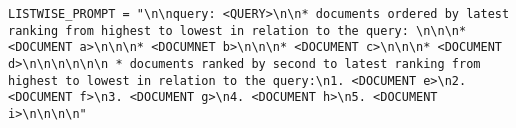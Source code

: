
\begin{lstlisting}[style=promptstyle]
LISTWISE_PROMPT = "\n\nquery: <QUERY>\n\n* documents ordered by latest ranking from highest to lowest in relation to the query: \n\n\n* <DOCUMENT a>\n\n\n* <DOCUMNET b>\n\n\n* <DOCUMENT c>\n\n\n* <DOCUMENT d>\n\n\n\n\n\n * documents ranked by second to latest ranking from highest to lowest in relation to the query:\n1. <DOCUMENT e>\n2. <DOCUMENT f>\n3. <DOCUMENT g>\n4. <DOCUMENT h>\n5. <DOCUMENT i>\n\n\n\n"
\end{lstlisting}